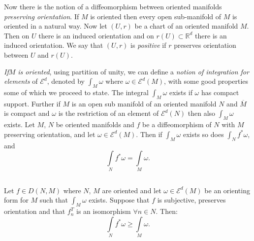 Now there is the notion of a diffeomorphism between oriented manifolds
{\em preserving orientation}. If $M$ is oriented then every open
sub-manifold of $M$ is oriented in a natural way. Now let $(U,r)$ be a
chart of an oriented manifold $M$. Then on $U$ there is an
induced orientation and on $r(U)\subset \mathbb{R}^{d}$ there is an induced
orientation. We say that $(U,r)$ is {\em positive} if $r$ preserves
orientation between $U$ and $r(U)$.

{\em If\pageoriginale $M$ is oriented}, using partition of unity, we
can define a 
{\em notion of integration for elements} of $\mathscr{E}^{d}$, denoted
by $\int_{M}\omega$ where $\omega\in\mathscr{E}^{d}(M)$, with some
good properties some of which we proceed to state. The integral
$\int_{M}\omega$ exists if $\omega$ has compact support. Further if
$M$ is an open sub manifold of an oriented manifold $N$ and
$\overline{M}$ is compact and $\omega$ is the restriction of an
element of $\mathscr{E}^{d}(N)$ then also $\int_{M}\omega$ exists. Let
$M$, $N$ be oriented manifolds and $f$ be a diffeomorphism of $N$ with
$M$ preserving orientation, and let
$\omega\in\mathscr{E}^{d}(M)$. Then if $\int_{M}\omega$ exists so does
$\int_{N}f^{\ast}\omega$, and 
\begin{equation*}
\int\limits_{N}f^{\ast}\omega=\int\limits_{M}\omega.\tag{0.3.9}\label{chap0:0.3.9}
\end{equation*}

\setcounter{subsection}{9}
\subsection{}\label{chap0:0.3.10}


\begin{lemma*}
Let $f\in D(N,M)$ where $N$, $M$ are oriented and let
$\omega\in\mathscr{E}^{d}(M)$ be an orienting form for $M$ such that
$\int_{M}\omega$ exists. Suppose that $f$ is subjective, preserves
orientation and that $f^{T}_{n}$ is an isomorphism $\forall n\in
N$. Then:
$$
\int\limits_{N}f^{\ast}\omega\geq \int\limits_{M}\omega.
$$
\end{lemma*}

